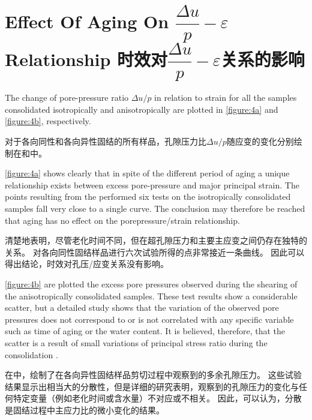 \section{Effect Of Aging On $\dfrac{\Delta{u}}{p}-\varepsilon$ Relationship 时效对$\dfrac{\Delta{u}}{p}-\varepsilon$关系的影响}

\begin{paracol}{2}
    
    The change of pore-pressure ratio $\Delta{u}/p$ in relation to strain for all the samples consolidated isotropically and anisotropically are plotted in \autoref{figure:4a} and \autoref{figure:4b}, respectively.

    \switchcolumn

    对于各向同性和各向异性固结的所有样品，孔隙压力比$\Delta{u}/p$随应变的变化分别绘制在和中。

    \switchcolumn*

    \autoref{figure:4a} shows clearly that in spite of the different period of aging a unique relationship exists between excess pore-pressure and major principal strain. The points resulting from the performed six tests on the isotropically consolidated samples fall very close to a single curve. The conclusion may therefore be reached that aging has no effect on the porepressure/strain relationship.

    \switchcolumn
        
    清楚地表明，尽管老化时间不同，但在超孔隙压力和主要主应变之间仍存在独特的关系。 对各向同性固结样品进行六次试验所得的点非常接近一条曲线。 因此可以得出结论，时效对孔压/应变关系没有影响。

    \switchcolumn*

    \autoref{figure:4b} are plotted the excess pore pressures observed during the shearing of the anisotropically consolidated samples. These test results show a considerable scatter, but a detailed study shows that the variation of the observed pore pressures does not correspond to or is not correlated with any specific variable such as time of aging or the water content. It is believed, therefore, that the scatter is a result of small variations of principal stress ratio during the consolidation \citep{Lo1961219}.

    \switchcolumn
        
    在中，绘制了在各向异性固结样品剪切过程中观察到的多余孔隙压力。 这些试验结果显示出相当大的分散性，但是详细的研究表明，观察到的孔隙压力的变化与任何特定变量（例如老化时间或含水量）不对应或不相关。 因此，可以认为，分散是固结过程中主应力比的微小变化的结果\citep{Lo1961219}。

\end{paracol}

